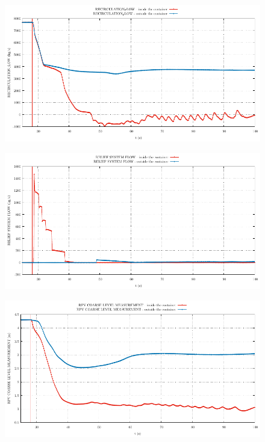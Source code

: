 \documentclass{article}
\begin{document}
\begin{multicols}{2}
\begin{figure}[H]
\end{figure}
\begin{figure}[H]
\centering
\includegraphics[width=\linewidth]{./graphs/RECIRCULATION_FLOW_comp.pdf}
\end{figure}
\begin{figure}[H]
\centering
\includegraphics[width=\linewidth]{./graphs/RELIEF SYSTEM FLOW_comp.pdf}
\end{figure}
\begin{figure}[H]
\centering
\includegraphics[width=\linewidth]{./graphs/RPV COARSE LEVEL MEASUREMENT_comp.pdf}

\end{figure}
\end{multicols}
\end{document}
